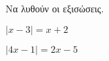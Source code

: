 \item Να λυθούν οι εξισώσεις.
\begin{multicols}{4}
\begin{alist}
\item $ \left|x-3\right|=x+2 $
\item $ \left|4x-1\right|=2x-5 $
\end{alist}
\end{multicols}
